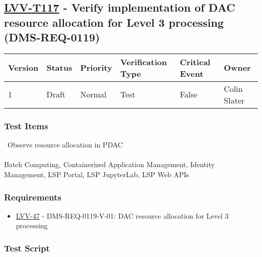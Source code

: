 \hypertarget{lvv-t117---verify-implementation-of-dac-resource-allocation-for-level-3-processing-dms-req-0119}{%
\subsection{\texorpdfstring{\href{https://jira.lsstcorp.org/secure/Tests.jspa\#/testCase/LVV-T117}{LVV-T117}
- Verify implementation of DAC resource allocation for Level 3
processing
(DMS-REQ-0119)}{LVV-T117 - Verify implementation of DAC resource allocation for Level 3 processing (DMS-REQ-0119)}}\label{lvv-t117---verify-implementation-of-dac-resource-allocation-for-level-3-processing-dms-req-0119}}

\begin{longtable}[]{@{}llllll@{}}
\toprule
Version & Status & Priority & Verification Type & Critical Event &
Owner\tabularnewline
\midrule
\endhead
1 & Draft & Normal & Test & False & Colin Slater\tabularnewline
\bottomrule
\end{longtable}

\hypertarget{test-items-93}{%
\subsubsection{Test Items}\label{test-items-93}}

~Observe resource allocation in PDAC\\
~\\
Batch Computing, Containerized Application Management, Identity
Management, LSP Portal, LSP JupyterLab, LSP Web APIs

\hypertarget{requirements-94}{%
\subsubsection{Requirements}\label{requirements-94}}

\begin{itemize}
\tightlist
\item
  \href{https://jira.lsstcorp.org/browse/LVV-47}{LVV-47} -
  DMS-REQ-0119-V-01: DAC resource allocation for Level 3 processing
\end{itemize}

\hypertarget{test-script-94}{%
\subsubsection{Test Script}\label{test-script-94}}

